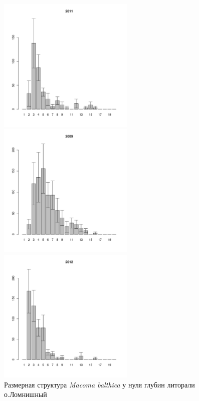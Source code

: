 \begin{figure}[hp]
\begin{minipage}[b]{.46\linewidth}
\begin{center}
	\end{center}
	\end{minipage}
	\hfill
	\begin{minipage}[b]{.46\linewidth}
	\begin{center}
	\includegraphics[width=65mm]{../White_Sea/Lomnishniy/Lomnishniy_2011_.pdf}
	\end{center}
	\end{minipage}
%
	\begin{minipage}[b]{.46\linewidth}
	\begin{center}
	\includegraphics[width=65mm]{../White_Sea/Lomnishniy/Lomnishniy_2009_.pdf}
	\end{center}
	\end{minipage}
	\hfill
	\begin{minipage}[b]{.46\linewidth}
	\begin{center}
	\includegraphics[width=65mm]{../White_Sea/Lomnishniy/Lomnishniy_2012_.pdf}
	\end{center}
	\end{minipage}
%
\caption{Размерная структура {\it Macoma balthica} у нуля глубин литорали о.Ломнишный}
\label{ris:size_str_Lomnishniy}
\end{figure}



